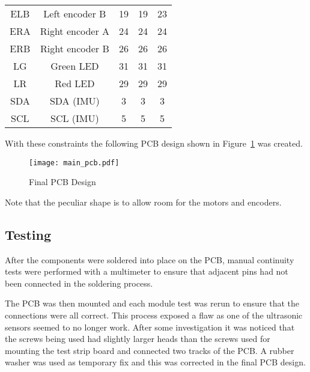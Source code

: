 \begin{table}[!ht]
\begin{tabular}{ccccc}
        ELB & Left encoder B         & 19 & 19 & 23 \\
        ERA & Right encoder A        & 24 & 24 & 24 \\
        ERB & Right encoder B        & 26 & 26 & 26 \\
        LG  & Green LED              & 31 & 31 & 31 \\
        LR  & Red LED                & 29 & 29 & 29 \\
        SDA & \isc{} SDA (IMU)       & 3  & 3  & 3  \\
        SCL & \isc{} SCL (IMU)       & 5  & 5  & 5  \\
        \bottomrule
    \end{tabular}
\end{table}

With these constraints the following PCB design shown in Figure~\ref{PCB_Design} was created.

\begin{figure}[!ht]
	\centering
	\texttt{[image: main\_pcb.pdf]}
	\caption{Final PCB Design}\label{PCB_Design}

\end{figure}
Note that the peculiar shape is to allow room for the motors and encoders.

\subsection{Testing}\label{elec/pcb/test}
After the components were soldered into place on the PCB, manual
continuity tests were performed with a multimeter to ensure that adjacent
pins had not been connected in the soldering process.

The PCB was then mounted and each module test was rerun to ensure that the
connections were all correct. This process exposed a flaw as one of the
ultrasonic sensors seemed to no longer work. After some investigation it
was noticed that the screws being used had slightly larger heads than the
screws used for mounting the test strip board and connected two
tracks of the PCB. A rubber washer was used as temporary fix and this was
corrected in the final PCB design.
